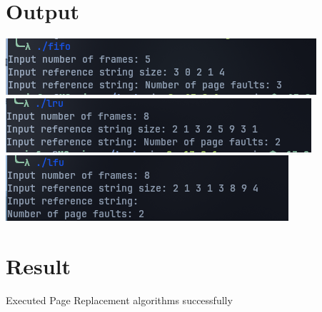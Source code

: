 \section{Output}
\includegraphics[width=0.5\linewidth]{Cycle_3//Outputs/fifo.png}
\includegraphics[width=0.5\linewidth]{Cycle_3//Outputs/lru.png}
\includegraphics[width=0.5\linewidth]{Cycle_3//Outputs/lfu.png}

\section{Result}
Executed Page Replacement algorithms successfully